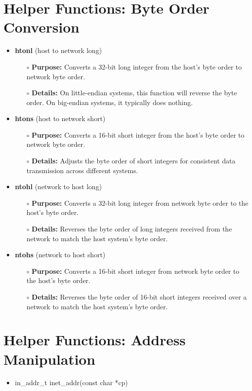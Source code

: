 \documentclass{report}
\begin{document}
\section{Helper Functions: Byte Order Conversion}
\begin{itemize}
  \item \textbf{htonl} (host to network long)
    \begin{itemize}
      \item[$\circ$] \textbf{Purpose:} Converts a 32-bit long integer from the host's byte order to network byte order.
      \item[$\circ$] \textbf{Details:} On little-endian systems, this function will reverse the byte order. On big-endian systems, it typically does nothing.
    \end{itemize}
  \item \textbf{htons} (host to network short)
    \begin{itemize}
      \item[$\circ$] \textbf{Purpose:} Converts a 16-bit short integer from the host's byte order to network byte order.
      \item[$\circ$] \textbf{Details:} Adjusts the byte order of short integers for consistent data transmission across different systems.
    \end{itemize}
  \item \textbf{ntohl} (network to host long)
    \begin{itemize}
      \item[$\circ$] \textbf{Purpose:} Converts a 32-bit long integer from network byte order to the host's byte order.
      \item[$\circ$] \textbf{Details:} Reverses the byte order of long integers received from the network to match the host system's byte order.
    \end{itemize}
  \item \textbf{ntohs} (network to host short)
    \begin{itemize}
      \item[$\circ$] \textbf{Purpose:} Converts a 16-bit short integer from network byte order to the host's byte order.
      \item[$\circ$] \textbf{Details:} Reverses the byte order of 16-bit short integers received over a network to match the host system's byte order.
    \end{itemize}
\end{itemize}
\section{Helper Functions: Address Manipulation}
\begin{itemize}
  \item in\_addr\_t inet\_addr(const char *cp)
\end{itemize}
\end{document}
